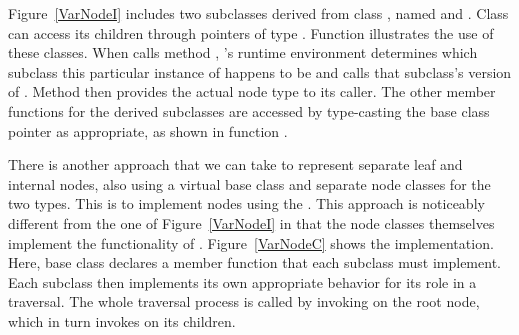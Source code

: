 Figure~\ref{VarNodeI} includes two subclasses derived from class
, named  and .
Class  can access its children through
pointers of type .
Function  illustrates the use of these classes.
When  calls method ,
\Lang's runtime environment
determines which subclass this particular instance of 
happens to be and calls that subclass's version of .
Method  then provides the actual node type to its caller.
The other member functions for the derived subclasses are accessed by
type-casting the base class pointer as appropriate, as shown in
function .

There is another approach that we can take to represent separate leaf
and internal nodes, also using a virtual base class and separate node
classes for the two types.
This is to implement nodes using the
.
This approach is noticeably different from the one of
Figure~\ref{VarNodeI} in that the node classes themselves implement
the functionality of .
Figure~\ref{VarNodeC} shows the implementation.
Here, base class  declares a member function
 that each subclass must implement.
Each subclass then implements its own appropriate behavior for its
role in a traversal.
The whole traversal process is called by invoking  on
the root node, which in turn invokes  on its children.

\begin{figure}

\bigskip
{}

\bigskip
{}

\bigskip
{}

\end{figure}

